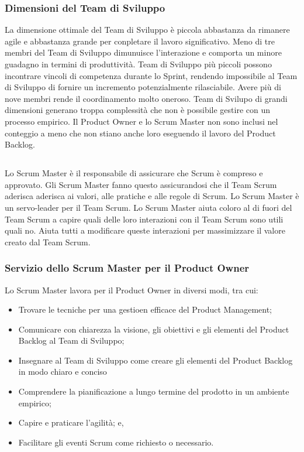 \subsubsection*{Dimensioni del Team di Sviluppo} %
\label{ssub:development_team_size}
La dimensione ottimale del Team di Sviluppo \`e piccola abbastanza da rimanere agile e abbastanza grande  per conpletare il lavoro 
significativo. Meno di tre membri del Team di Sviluppo dimunuisce l'interazione e comporta un minore guadagno in termini di produttivit\`a.
Team di Sviluppo pi\`u piccoli possono incontrare vincoli di competenza durante lo Sprint, rendendo  impossibile al Team di 
Sviluppo di fornire un incremento potenzialmente rilasciabile. Avere pi\`u di nove membri rende il coordinamento molto oneroso. Team di 
Svilupo di grandi dimensioni generano troppa complessit\`a che non \`e possibile gestire con un processo empirico. Il Product Owner e lo 
Scrum Master non sono inclusi nel conteggio a meno che non stiano anche loro eseguendo il lavoro del Product Backlog.

\subsection*{\color{SteelBlue}{Lo Scrum Master}}%
\label{sec:scrummaster}
Lo Scrum Master \`e il responsabile di assicurare che Scrum \`e compreso e approvato. Gli Scrum Master fanno questo assicurandosi che il 
Team Scrum aderisca aderisca ai valori, alle pratiche e alle regole di Scrum. Lo Scrum Master \`e un servo-leader per il Team Scrum. \newline
Lo Scrum Master aiuta coloro al di fuori del Team Scrum a capire quali delle loro interazioni con il Team Scrum sono utili  quali no. Aiuta 
tutti a modificare queste interazioni per massimizzare il valore creato dal Team Scrum.

\subsubsection*{Servizio dello Scrum Master per il Product Owner} %
\label{ssub:sm_service_to_po}
Lo Scrum Master lavora per il Product Owner in diversi modi, tra cui:
\begin{itemize}
	\item Trovare le tecniche per una gestioen efficace del Product Management;
	\item Comunicare con chiarezza la visione, gli obiettivi e gli elementi del Product Backlog al Team di Sviluppo;
	\item Insegnare al Team di Sviluppo come creare gli elementi del Product Backlog in modo chiaro e conciso
	\item Comprendere la pianificazione a lungo termine del prodotto in un ambiente empirico;
	\item Capire e praticare l'agilit\`a; e,
	\item Facilitare gli eventi Scrum come richiesto o necessario.
\end{itemize}

